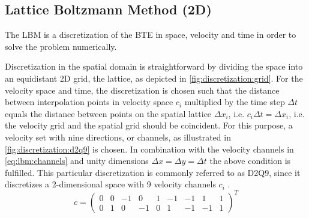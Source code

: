 \subsection{Lattice Boltzmann Method (2D)}

The \gls{LBM} is a discretization of the \gls{BTE} in space, velocity and time in order to solve the problem numerically.

Discretization in the spatial domain is straightforward by dividing the space into an equidistant 2D grid, the lattice, as depicted in \cref{fig:discretization:grid}. For the velocity space and time, the discretization is chosen such that the distance between interpolation points in velocity space $c_i$ multiplied by the time step $\Delta t$ equals the distance between points on the spatial lattice $\Delta x_i$, i.e. $c_i \Delta t = \Delta x_i$, i.e. the velocity grid and the spatial grid should be coincident. For this purpose, a velocity set with nine directions, or channels, as illustrated in \cref{fig:discretization:d2q9} is chosen. In combination with the velocity channels in \cref{eq:lbm:channels} and unity dimensions $\Delta x = \Delta y = \Delta t$ the above condition is fulfilled. This particular discretization is commonly referred to as D2Q9, since it discretizes a 2-dimensional space with 9 velocity channels $c_i$ \cite{timm2016lattice}.
\begin{equation}
    c = \begin{pmatrix}
        0 & 0 & -1 & 0 & 1 & -1 & -1 & 1 & 1 \\
        0 & 1 & 0 & -1 & 0 & 1 & -1 & -1 & 1
    \end{pmatrix}^T
    \label{eq:lbm:channels}
\end{equation}
